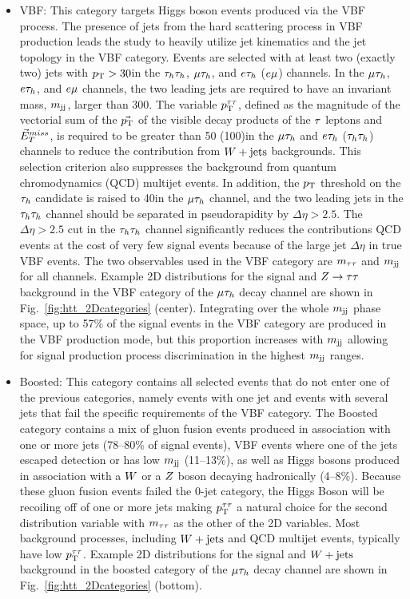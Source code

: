 \begin{itemize}
\item {VBF}: This category targets Higgs boson events produced via the VBF process.
The presence of jets from the hard scattering process in VBF production leads the study to heavily
utilize jet kinematics and the jet topology in the VBF category.
Events are selected with at least two (exactly two) jets with $p_\mathrm{T}>30$\GeV in the
$\tau_{h}\tau_{h}$, $\mu\tau_{h}$, and $e\tau_{h}$ ($e\mu$) channels.
In the $\mu\tau_{h}$, $e\tau_{h}$, and $e\mu$ channels, the two leading jets are required to have 
an invariant mass, $m_\mathrm{jj}$, larger than 300\GeV. The variable $p_\mathrm{T}^{\tau\tau}$, defined as the magnitude 
of the vectorial sum of the $\vec{p_\mathrm{T}}$ of the visible decay products of the $\tau$ leptons 
and $\vec{E}^{miss}_T$, is required to be greater than 50 (100)\GeV in the $\mu\tau_{h}$
 and $e\tau_{h}$ ($\tau_{h}\tau_{h}$) channels to reduce the contribution from $W+\text{jets}$ 
backgrounds. This selection criterion also suppresses the background from quantum 
chromodynamics (QCD) multijet events. In addition, the $p_\mathrm{T}$ threshold on the $\tau_{h}$ 
candidate is raised to 40\GeV in the $\mu\tau_{h}$ channel, and the two leading jets in the 
$\tau_{h}\tau_{h}$ channel should be separated in pseudorapidity by $\Delta\eta>2.5$. The $\Delta\eta>2.5$
cut in the $\tau_{h}\tau_{h}$ channel significantly reduces the contributions QCD events at the cost
of very few signal events because of the large jet $\Delta\eta$ in true VBF events.
The two observables used in the VBF category are $m_{\tau\tau}$ and $m_\mathrm{jj}$ for all channels. Example 2D 
distributions for the signal and $Z\to\tau\tau$ background
in the VBF category of the $\mu\tau_{h}$ decay channel are shown in Fig.~\ref{fig:htt_2Dcategories} (center). 
Integrating over the whole $m_\mathrm{jj}$ phase space, up to 57\% of the signal events in the VBF 
category are produced in the VBF production mode, but this proportion increases with $m_\mathrm{jj}$ allowing
for signal production process discrimination in the highest $m_\mathrm{jj}$ ranges.\\

\item {Boosted}: This category contains all selected events that do not enter one of the previous 
categories, namely events with one jet and events with several jets that fail the specific requirements of the VBF category.
The Boosted category contains a mix of gluon fusion events produced in association with one or more jets (78--80\% of signal events),
VBF events where one of the jets escaped detection or has low $m_\mathrm{jj}$ (11--13\%), as well as
Higgs bosons produced in association with a $W$ or a $Z$ boson decaying hadronically (4--8\%).
Because these gluon fusion events failed the 0-jet category, the Higgs Boson will be recoiling 
off of one or more jets making $p_\mathrm{T}^{\tau\tau}$ a natural choice for the second distribution variable with
$m_{\tau\tau}$ as the other of the 2D variables. 
Most background processes, including $W+\text{jets}$ and QCD multijet events, typically have low $p_\mathrm{T}^{\tau\tau}$. 
Example 2D distributions for the signal and $W+\text{jets}$ background in the boosted category of 
the $\mu\tau_{h}$ decay channel are shown in Fig.~\ref{fig:htt_2Dcategories} (bottom).
\end{itemize}

